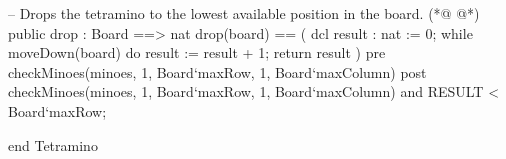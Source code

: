 \begin{vdmpp}[breaklines=true]
  -- Drops the tetramino to the lowest available position in the board.
(*@
\label{drop:185}
@*)
  public drop : Board ==> nat
  drop(board) == (
   dcl result : nat := 0;
   while moveDown(board) do 
    result := result + 1;
   return result
  )
  pre checkMinoes(minoes, 1, Board`maxRow, 1, Board`maxColumn)
  post checkMinoes(minoes, 1, Board`maxRow, 1, Board`maxColumn) 
   and RESULT < Board`maxRow;
  
end Tetramino
\end{vdmpp}
